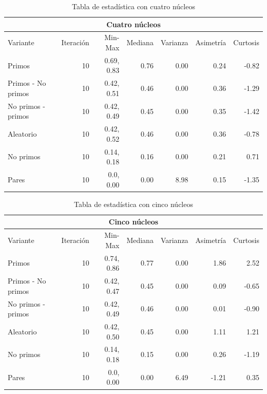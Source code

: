 \documentclass{article}
\begin{document}
\begin{table}[H]
\begin{center}
\begin{tabular}{|l | r | r | r | r | r | r|}
\hline
\multicolumn{7}{|c|}{Cuatro núcleos}\\
\hline
Variante&Iteración&Min-Max&Mediana&Varianza&Asimetría&Curtosis\\
\hline
 Primos               & 10 & 0.69, 0.83  & 0.76 & 0.00 & 0.24  & -0.82\\
 Primos - No primos   & 10 & 0.42, 0.51  & 0.46 & 0.00 & 0.36  & -1.29\\
 No primos - primos   & 10 & 0.42, 0.49  &0.45 & 0.00 & 0.35   & -1.42\\
 Aleatorio            & 10 & 0.42, 0.52  & 0.46 & 0.00 &0.36   & -0.78\\
 No primos            & 10 & 0.14, 0.18  & 0.16 & 0.00 & 0.21  &0.71\\
 Pares                & 10 & 0.0, 0.00  & 0.00 & 8.98 & 0.15   & -1.35\\
\hline
\end{tabular}
\caption{Tabla de estadística con cuatro núcleos}
\label{table:1}
\end{center}
\end{table}

\begin{table}[H]
\begin{center}
\begin{tabular}{|l | r | r | r | r | r | r|}
\hline
\multicolumn{7}{|c|}{Cinco núcleos}\\
\hline
Variante&Iteración&Min-Max&Mediana&Varianza&Asimetría&Curtosis\\
\hline
 Primos               & 10 & 0.74, 0.86  & 0.77 & 0.00 & 1.86  & 2.52\\
 Primos - No primos   & 10 & 0.42, 0.47  & 0.45 & 0.00 & 0.09  & -0.65\\
 No primos - primos   & 10 & 0.42, 0.49  &0.46 & 0.00 & 0.01   & -0.90\\
 Aleatorio            & 10 & 0.42, 0.50  & 0.45 & 0.00 &1.11   & 1.21\\
 No primos            & 10 & 0.14, 0.18  & 0.15 & 0.00 & 0.26  &-1.19\\
 Pares                & 10 & 0.0, 0.00  & 0.00 & 6.49 & -1.21   & 0.35\\
\hline
\end{tabular}
\caption{Tabla de estadística con cinco núcleos}
\label{table:1}
\end{center}
\end{table}
\end{document}
